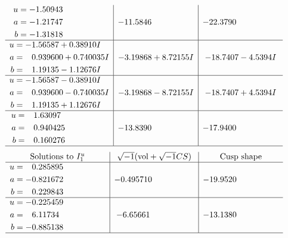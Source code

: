 \documentclass[1p]{elsarticle_modified}
\theoremstyle{definition}
\newcommand{\I}{\sqrt{-1}}
\begin{document}
$$\begin{array}{c|c|c}
\begin{aligned}
u &= -1.50943\phantom{ +0.000000I} \\
a &= -1.21747\phantom{ +0.000000I} \\
b &= -1.31818\phantom{ +0.000000I}\end{aligned}
 & -11.5846\phantom{ +0.000000I} & -22.3790\phantom{ +0.000000I} \\ \hline\begin{aligned}
u &= -1.56587 + 0.38910 I \\
a &= \phantom{-}0.939600 + 0.740035 I \\
b &= \phantom{-}1.19135 - 1.12676 I\end{aligned}
 & -3.19868 + 8.72155 I & -18.7407 - 4.5394 I \\ \hline\begin{aligned}
u &= -1.56587 - 0.38910 I \\
a &= \phantom{-}0.939600 - 0.740035 I \\
b &= \phantom{-}1.19135 + 1.12676 I\end{aligned}
 & -3.19868 - 8.72155 I & -18.7407 + 4.5394 I \\ \hline\begin{aligned}
u &= \phantom{-}1.63097\phantom{ +0.000000I} \\
a &= \phantom{-}0.940425\phantom{ +0.000000I} \\
b &= \phantom{-}0.160276\phantom{ +0.000000I}\end{aligned}
 & -13.8390\phantom{ +0.000000I} & -17.9400\phantom{ +0.000000I}\\
 \hline 
 \end{array}$$\newpage$$\begin{array}{c|c|c}  
\text{Solutions to }I^u_{1}& \I (\text{vol} + \sqrt{-1}CS) & \text{Cusp shape}\\
 \hline 
\begin{aligned}
u &= \phantom{-}0.285895\phantom{ +0.000000I} \\
a &= -0.821672\phantom{ +0.000000I} \\
b &= \phantom{-}0.229843\phantom{ +0.000000I}\end{aligned}
 & -0.495710\phantom{ +0.000000I} & -19.9520\phantom{ +0.000000I} \\ \hline\begin{aligned}
u &= -0.225459\phantom{ +0.000000I} \\
a &= \phantom{-}6.11734\phantom{ +0.000000I} \\
b &= -0.885138\phantom{ +0.000000I}\end{aligned}
 & -6.65661\phantom{ +0.000000I} & -13.1380\phantom{ +0.000000I}\\
 \hline 
 \end{array}$$\newpage\newpage\renewcommand{\arraystretch}{1}
\end{document}
